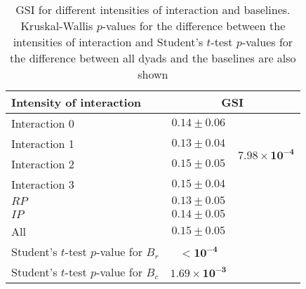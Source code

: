 \begin{table}
\caption{GSI for different intensities of interaction and baselines. Kruskal-Wallis $p$-values for the difference between the intensities of interaction and Student's $t$-test $p$-values for the difference between all dyads and the baselines are also shown\label{tab:coherence_interaction}}
\begin{tabular}{lcc}
\toprule
Intensity of interaction & \multicolumn{2}{c}{GSI}  \\
\midrule
Interaction 0 & $0.14 \pm 0.06$ & \multirow{4}{*}{$\mathbf{7.98 \times 10^{-4}}$} \\
Interaction 1 & $0.13 \pm 0.04$ & \\
Interaction 2 & $0.15 \pm 0.05$ & \\
Interaction 3 & $0.15 \pm 0.04$ & \\
\midrule
$RP$ & $0.13 \pm 0.05$ & \\
$IP$ & $0.14 \pm 0.05$ & \\
\midrule
All & $0.15 \pm 0.05$ & \\
\midrule
Student's $t$-test $p$-value for $B_r$ & $\mathbf{< 10^{-4}}$ &\\
Student's $t$-test $p$-value for $B_c$ & $\mathbf{1.69 \times 10^{-3}}$  &\\
\bottomrule
\end{tabular}
\end{table}
